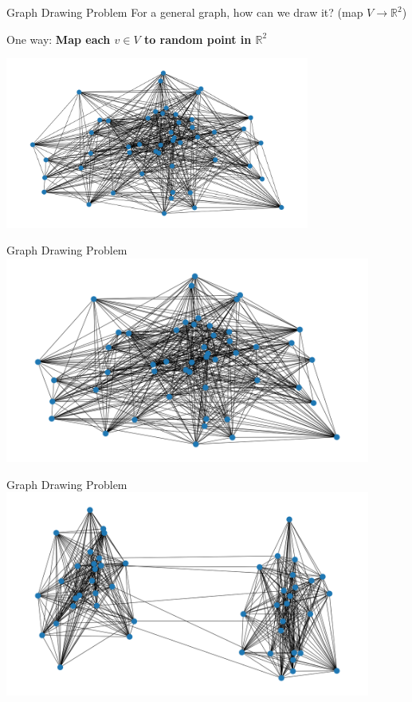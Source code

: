 \documentclass[aspectratio=169,xcolor=dvipsnames]{beamer}
\begin{document}
\begin{frame}{Graph Drawing Problem}
\centering
For a general graph, how can we draw it? (map $V \to \mathbb{R}^2$)

\pause \alert{One way}: \textbf{Map each $v \in V$ to random point in $\mathbb{R}^2$}

\pause\includegraphics[width=0.75\textwidth]{anim-0}
\end{frame}

\begin{frame}{Graph Drawing Problem}
\centering
\includegraphics[width=0.9\textwidth]{anim-0}
\end{frame}
\begin{frame}{Graph Drawing Problem}
\centering
\includegraphics[width=0.9\textwidth]{anim-1}
\end{frame}
\end{document}
